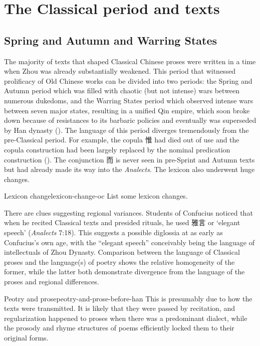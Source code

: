 \documentclass[UTF8, a4paper, oneside, scheme=plain, 12pt]{ctexrep}
\newcommand{\work}[1]{\textit{#1}}
\newcommand{\translate}[1]{`#1'}
\begin{document}
\section{The Classical period and texts}\label{sec:introduction.text}

\subsection{Spring and Autumn and Warring States}\label{sec:intro.sprint-and-autumn}

The majority of texts that shaped Classical Chinese proses
were written in a time when Zhou was already substantially weakened.
This period that witnessed prolificacy of Old Chinese works
can be divided into two periods:
the Spring and Autumn period which was filled with chaotic (but not intense) wars between numerous dukedoms,
and the Warring States period which observed intense wars between seven major states,
resulting in a unified Qin empire,
which soon broke down because of resistances to its barbaric policies 
and eventually was superseded by Han dynasty ().
The language of this period diverges tremendously from the pre-Classical period.
For example, the copula 惟 had died out of use 
and the copula construction had been largely replaced by the nominal predication construction
().
The conjunction 而 is never seen in pre-Sprint and Autumn texts
but had already made its way into the \work{Analects}.
The lexicon also underwent huge changes.

\begin{todobox}{Lexicon change}{lexicon-change-oc}
    List some lexicon changes.
\end{todobox}

There are clues suggesting regional variances.
Students of Confucius noticed that when he recited Classical texts and presided rituals,
he used 雅言 or \translate{elegant speech} (\work{Analects} 7:18).
This suggests a possible diglossia at as early as Confucius's own age,
with the ``elegant speech'' conceivably being the language of intellectuals of Zhou Dynasty.
Comparison between the language of Classical proses and the language(s) of poetry
shows the relative homogeneity of the former,
while the latter both demonstrate divergence from the language of the proses
and regional differences.

\begin{todobox}{Peotry and prose}{peotry-and-prose-before-han}
    This is presumably due to how the texts were transmitted.
    It is likely that they were passed by recitation,
    and regularization happened to proses when there was a predominant dialect,
    while the prosody and rhyme structures of poems
    efficiently locked them to their original forms.
\end{todobox}
\end{document}
